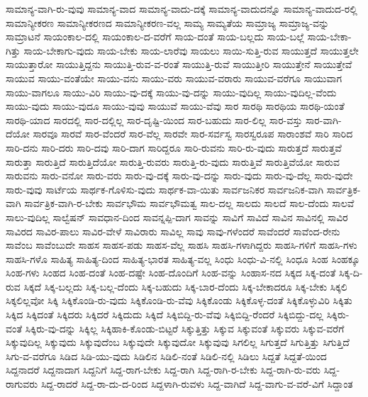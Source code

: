 {ಸಾಮಾನ್ಯ-ವಾಗಿ-ರು-ವುವು
ಸಾಮಾನ್ಯ-ವಾದ
ಸಾಮಾನ್ಯ-ವಾದು-ದಕ್ಕೆ
ಸಾಮಾನ್ಯ-ವಾದುದನ್ನೊ
ಸಾಮಾನ್ಯ-ವಾದುದ-ರಲ್ಲಿ
ಸಾಮಾನ್ಯೀಕರಣ
ಸಾಮಾನ್ಯೀಕರಣದ
ಸಾಮಾನ್ಯೀಕರಣ-ವಲ್ಲ
ಸಾಮ್ಯ
ಸಾಮ್ಯತೆಯ
ಸಾಮ್ರಾಜ್ಯ
ಸಾಮ್ರಾಜ್ಯ-ವನ್ನು
ಸಾಮ್ರಾಟನೆ
ಸಾಯಂಕಾಲ-ದಲ್ಲಿ
ಸಾಯಂಕಾಲ-ದ-ವರೆಗೆ
ಸಾಯ-ದಂತೆ
ಸಾಯ-ಬಲ್ಲದು
ಸಾಯ-ಬಲ್ಲೆ
ಸಾಯ-ಬೇಕಾ-ಗಿತ್ತು
ಸಾಯ-ಬೇಕಾಗು-ವುದು
ಸಾಯ-ಬೇಕು
ಸಾಯ-ಲಾರೆವು
ಸಾಯಲು
ಸಾಯಿ-ಸುತ್ತಿ-ರುವ
ಸಾಯುತ್ತದೆ
ಸಾಯುತ್ತಲೇ
ಸಾಯುತ್ತಾರೋ
ಸಾಯುತ್ತಿದ್ದನು
ಸಾಯುತ್ತಿ-ರುವ-ವ-ರಂತೆ
ಸಾಯುತ್ತಿ-ರುವೆ
ಸಾಯುತ್ತೀರಿ
ಸಾಯುತ್ತೇನೆ
ಸಾಯುತ್ತೇವೆ
ಸಾಯುವ
ಸಾಯು-ವಂತೆಯೇ
ಸಾಯು-ವನು
ಸಾಯು-ವರು
ಸಾಯುವ-ವರಾರು
ಸಾಯುವ-ವರೆಗೂ
ಸಾಯುವಾಗ
ಸಾಯು-ವಾಗಲೂ
ಸಾಯು-ವಿರಿ
ಸಾಯು-ವು-ದಕ್ಕೆ
ಸಾಯು-ವು-ದನ್ನು
ಸಾಯು-ವುದಿಲ್ಲ
ಸಾಯು-ವುದಿಲ್ಲ-ವೆಂದು
ಸಾಯು-ವುದು
ಸಾಯು-ವುದೂ
ಸಾಯು-ವುವು
ಸಾಯುವೆ
ಸಾಯು-ವೆವು
ಸಾರ
ಸಾರಥಿ
ಸಾರಥಿಯ
ಸಾರಥಿ-ಯಂತೆ
ಸಾರಥಿ-ಯಾದ
ಸಾರದಲ್ಲಿ
ಸಾರ-ದಲ್ಲಿಲ್ಲ
ಸಾರ-ದೃಷ್ಟಿ-ಯಿಂದ
ಸಾರ-ಬಹುದು
ಸಾರ-ಲಿಲ್ಲ
ಸಾರ-ವಸ್ತು
ಸಾರ-ವಾಗಿ-ದೆಯೋ
ಸಾರವೂ
ಸಾರವೆ
ಸಾರ-ವೆಂದರೆ
ಸಾರ-ವೆಲ್ಲ
ಸಾರವೇ
ಸಾರ-ಸರ್ವಸ್ವ
ಸಾರಸ್ವರೂಪ
ಸಾರಾಂಶವೆ
ಸಾರಿ
ಸಾರಿದ
ಸಾರಿ-ದನು
ಸಾರಿ-ದರು
ಸಾರಿ-ದವು
ಸಾರಿ-ದಾಗ
ಸಾರಿದ್ದರೂ
ಸಾರಿ-ರುವನು
ಸಾರಿ-ರು-ವುದು
ಸಾರುತ್ತದೆ
ಸಾರುತ್ತವೆ
ಸಾರುತ್ತಾ
ಸಾರುತ್ತಿದೆ
ಸಾರುತ್ತಿದೆಯೋ
ಸಾರುತ್ತಿ-ರುವರು
ಸಾರುತ್ತಿ-ರು-ವುದು
ಸಾರುತ್ತಿವೆ
ಸಾರುತ್ತಿವೆಯೋ
ಸಾರುವ
ಸಾರುವನು
ಸಾರು-ವನೋ
ಸಾರು-ವರು
ಸಾರು-ವು-ದಕ್ಕೆ
ಸಾರು-ವು-ದನ್ನು
ಸಾರು-ವುದು
ಸಾರು-ವು-ದೆಲ್ಲ
ಸಾರು-ವುದೇ
ಸಾರು-ವುವು
ಸಾರ್ಟೆಯ
ಸಾರ್ಥಕ-ಗೊಳಿಸು-ವುದು
ಸಾರ್ಥಕ-ವಾ-ಯಿತು
ಸಾರ್ವಜನಿಕರ
ಸಾರ್ವಜನಿಕ-ವಾಗಿ
ಸಾರ್ವತ್ರಿಕ-ವಾಗಿ
ಸಾರ್ವತ್ರಿಕ-ವಾಗಿ-ರ-ಬೇಕು
ಸಾರ್ವಭೌಮ
ಸಾರ್ವಭೌಮತ್ವ
ಸಾಲ-ದಲ್ಲ
ಸಾಲದು
ಸಾಲದೆ
ಸಾಲ-ದೆಂದು
ಸಾಲವೆ
ಸಾಲು-ವುದಿಲ್ಲ
ಸಾಲ್ವೆಷನ್
ಸಾವಧಾನ-ದಿಂದ
ಸಾವನ್ನಪ್ಪಿ-ದಾಗ
ಸಾವನ್ನು
ಸಾವಿಗೆ
ಸಾವಿದೆ
ಸಾವಿನ
ಸಾವಿನಲ್ಲಿ
ಸಾವಿರ
ಸಾವಿರದ
ಸಾವಿರ-ಪಾಲು
ಸಾವಿರ-ವೇಳೆ
ಸಾವಿರಾರು
ಸಾವಿಲ್ಲ
ಸಾವು
ಸಾವು-ಗಳೆಂದರೆ
ಸಾವೆಂದರೆ
ಸಾವೆಂದ-ರೇನು
ಸಾವೆಂಬ
ಸಾವೆಂಬುದೇ
ಸಾಹಸ
ಸಾಹಸ-ಪಡು
ಸಾಹಸ-ವೆಲ್ಲ
ಸಾಹಸಿ
ಸಾಹಸಿ-ಗಳಾಗಿದ್ದರು
ಸಾಹಸಿ-ಗಳಿಗೆ
ಸಾಹಸಿ-ಗಳು
ಸಾಹಸಿ-ಗಳೊ
ಸಾಹಿತ್ಯ
ಸಾಹಿತ್ಯ-ದಿಂದ
ಸಾಹಿತ್ಯ-ಭಾರತ
ಸಾಹಿತ್ಯ-ವಲ್ಲ
ಸಿಂಧು
ಸಿಂಧು-ವಿ-ನಲ್ಲಿ
ಸಿಂಧೂ
ಸಿಂಹ
ಸಿಂಹಕ್ಕೂ
ಸಿಂಹ-ಗಳು
ಸಿಂಹದ
ಸಿಂಹ-ದಂತೆ
ಸಿಂಹ-ದಷ್ಟೇ
ಸಿಂಹ-ದೊಂದಿಗೆ
ಸಿಂಹ-ವನ್ನು
ಸಿಂಹಾಸ-ನದ
ಸಿಕ್ಕದ
ಸಿಕ್ಕ-ದಂತೆ
ಸಿಕ್ಕ-ದಿ-ರುವ
ಸಿಕ್ಕದೆ
ಸಿಕ್ಕ-ಬಲ್ಲದು
ಸಿಕ್ಕ-ಬಲ್ಲ-ದೆಂದು
ಸಿಕ್ಕ-ಬಹುದು
ಸಿಕ್ಕ-ಬಾರ-ದೆಂದು
ಸಿಕ್ಕ-ಬೇಕಾದರೂ
ಸಿಕ್ಕ-ಬೇಕು
ಸಿಕ್ಕಲಿ
ಸಿಕ್ಕಲಿಲ್ಲವೋ
ಸಿಕ್ಕಿ
ಸಿಕ್ಕಿಕೊಂಡಿ-ರು-ವುದು
ಸಿಕ್ಕಿಕೊಂಡಿ-ರು-ವೆವು
ಸಿಕ್ಕಿಕೊಂಡು
ಸಿಕ್ಕಿಕೊಳ್ಳ-ದಂತೆ
ಸಿಕ್ಕಿಕೊಳ್ಳುವಿರಿ
ಸಿಕ್ಕಿತು
ಸಿಕ್ಕಿದ
ಸಿಕ್ಕಿದಂತೆ
ಸಿಕ್ಕಿದರು
ಸಿಕ್ಕಿದರೆ
ಸಿಕ್ಕಿದುದು
ಸಿಕ್ಕಿದೆ
ಸಿಕ್ಕಿಬಿದ್ದಿ-ರು-ವೆವು
ಸಿಕ್ಕಿಬಿದ್ದಿ-ರೆಂದರೆ
ಸಿಕ್ಕಿಬಿದ್ದು-ದಲ್ಲ
ಸಿಕ್ಕಿರು-ವಂತೆ
ಸಿಕ್ಕಿರು-ವು-ದನ್ನು
ಸಿಕ್ಕಿಲ್ಲ
ಸಿಕ್ಕಿಹಾಕಿ-ಕೊಂಡು-ಬಿಟ್ಟರೆ
ಸಿಕ್ಕುತ್ತಿತ್ತು
ಸಿಕ್ಕುವ
ಸಿಕ್ಕುವಂತೆ
ಸಿಕ್ಕುವರು
ಸಿಕ್ಕುವ-ವರೆಗೆ
ಸಿಕ್ಕುವುದಿಲ್ಲ
ಸಿಕ್ಕುವುದು
ಸಿಕ್ಕುವುದೆಂಬ
ಸಿಕ್ಕುವುದೇ
ಸಿಕ್ಕುವುದೋ
ಸಿಕ್ಕುವುವು
ಸಿಗಲಿಲ್ಲ
ಸಿಗುತ್ತದೆ
ಸಿಗುತ್ತಿತ್ತು
ಸಿಗುತ್ತಿದೆ
ಸಿಗು-ವ-ವರೆಗೂ
ಸಿಡಿದ
ಸಿಡಿ-ಯು-ವುದು
ಸಿಡಿಲಿನ
ಸಿಡಿಲಿ-ನಂತೆ
ಸಿಡಿಲಿ-ನಲ್ಲಿ
ಸಿಡಿಲು
ಸಿದ್ದತೆ
ಸಿದ್ದತೆ-ಯಿಂದ
ಸಿದ್ದನಾದರೆ
ಸಿದ್ದನಾದಾಗ
ಸಿದ್ದನಿಗೆ
ಸಿದ್ದ-ರಾಗ-ಬೇಕು
ಸಿದ್ದ-ರಾಗಿ
ಸಿದ್ದ-ರಾಗಿ-ರ-ಬೇಕು
ಸಿದ್ದ-ರಾಗಿ-ರು-ವರು
ಸಿದ್ದ-ರಾಗುವರು
ಸಿದ್ದ-ರಾದರೆ
ಸಿದ್ದ-ರಾ-ದು-ದ-ರಿಂದ
ಸಿದ್ದಳಾಗಿ-ರುವಳು
ಸಿದ್ದ-ವಾಗಿದೆ
ಸಿದ್ದ-ವಾಗು-ವ-ವರೆ-ವಿಗೆ
ಸಿದ್ದಾಂತ
}
